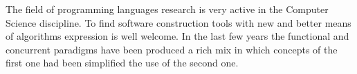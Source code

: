 
The field of programming languages research is very active in the Computer Science discipline. To find software construction tools with new and better means of algorithms expression is well welcome. In the last few years the functional and concurrent paradigms have been produced a rich mix in which concepts of the first one had been simplified the use of the second one.

